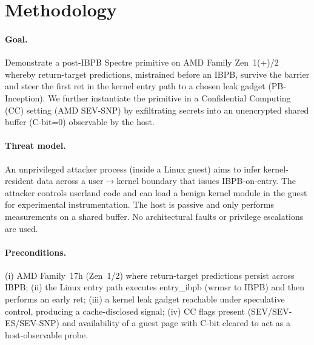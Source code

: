 \documentclass[11pt,a4paper]{article}
\begin{document}
\section{Methodology}
\label{sec:methodology}

\paragraph{Goal.}
Demonstrate a post-IBPB Spectre primitive on AMD Family Zen~1(+)/2 whereby return-target predictions, mistrained before an IBPB, survive the barrier and steer the first ret in the kernel entry path to a chosen leak gadget (PB-Inception). We further instantiate the primitive in a Confidential Computing (CC) setting (AMD SEV-SNP) by exfiltrating secrets into an unencrypted shared buffer (C-bit=0) observable by the host.

\paragraph{Threat model.}
An unprivileged attacker process (inside a Linux guest) aims to infer kernel-resident data across a user$\rightarrow$kernel boundary that issues IBPB-on-entry. The attacker controls userland code and can load a benign kernel module in the guest for experimental instrumentation. The host is passive and only performs measurements on a shared buffer. No architectural faults or privilege escalations are used.

\paragraph{Preconditions.}
(i) AMD Family~17h (Zen~1/2) where return-target predictions persist across IBPB; (ii) the Linux entry path executes entry\_ibpb (wrmsr to IBPB) and then performs an early ret; (iii) a kernel leak gadget reachable under speculative control, producing a cache-disclosed signal; (iv) CC flags present (SEV/SEV-ES/SEV-SNP) and availability of a guest page with C-bit cleared to act as a host-observable probe.%
\end{document}
